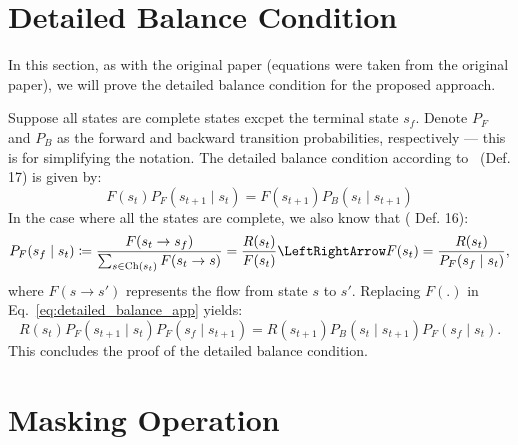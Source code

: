 \documentclass{lxaiproposal}
\begin{document}
    \pagebreak
    \newpage
    \clearpage
    
    

    \makeappendix

    \appendix

    \renewcommand\theequation{\thesection\arabic{equation}}


    \section{Detailed Balance Condition}\label{app:detailed_balance}
    \vspace*{-3mm}

    In this section, as with the original paper (equations were taken from the original paper), we will prove the detailed balance condition
    for the proposed approach.

    Suppose all states are complete states excpet the terminal state $s_f$. Denote $P_F$ and $P_B$ as the forward
    and backward transition probabilities, respectively --- this is for simplifying the notation. The detailed balance
    condition according to~\cite{bengio2023gflownetfoundations} (Def. 17) is given by:
    \begin{equation}
        F(s_t)P_F(s_{t+1} \mid s_t) = F(s_{t+1})P_B(s_t \mid s_{t+1})
        \label{eq:detailed_balance_app}
    \end{equation}
    In the case where all the states are complete, we also know that (\cite{bengio2023gflownetfoundations} Def. 16):
    \[
        P_F(s_f \mid s_t) \coloneq \frac{F(s_t \to s_f)}{\sum_{s \in \text{Ch}(s_t)} F(s_t \to s)} = \frac{R(s_t)}{F(s_t)}
        \LeftRightArrow F(s_t) = \frac{R(s_t)}{P_F(s_f \mid s_t)},
    \]
    where $F(s \to s')$ represents the flow from state $s$ to  $s'$. Replacing $F(.)$ in Eq.~\eqref{eq:detailed_balance_app}
    yields:
    \begin{equation}
        R(s_t)P_F(s_{t+1} \mid s_t)P_F(s_f \mid s_{t+1}) = R(s_{t+1})P_B(s_t \mid s_{t+1})P_F(s_f \mid s_t).
        \label{eq:detailed_balance_app2}
    \end{equation}
    This concludes the proof of the detailed balance condition.


    \section{Masking Operation}\label{app:masking}
    \vspace*{-3mm}
\end{document}
